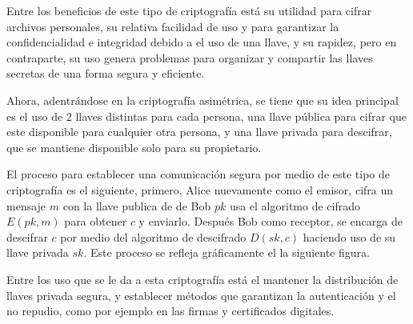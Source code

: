     Entre los beneficios de este tipo de criptografía está su utilidad para 
    cifrar archivos personales, su relativa facilidad de uso y para garantizar 
    la confidencialidad e integridad debido a el uso de una llave, y su 
    rapidez, pero en contraparte, su uso genera problemas para organizar y 
    compartir las llaves secretas de una forma segura y eficiente.
  
    Ahora, adentrándose en la criptografía asimétrica, se tiene que su idea 
    principal es el uso de 2 llaves distintas para cada persona, una llave 
    pública para cifrar que este disponible para cualquier otra persona, y una 
    llave privada para descifrar, que se mantiene disponible solo para su 
    propietario.
  
    El proceso para establecer una comunicación segura por medio de este tipo 
    de criptografía es el siguiente, primero, Alice nuevamente como el emisor, 
    cifra un mensaje $m$ con la llave publica de de Bob $pk$ usa el algoritmo 
    de cifrado $E(pk,m)$ para obtener $c$ y enviarlo. Después Bob como 
    receptor, se encarga de descifrar $c$ por medio del algoritmo de 
    descifrado $D(sk,c)$ haciendo uso de su llave privada $sk$. Este proceso 
    se refleja gráficamente el la siguiente figura.

    Entre los uso que se le da a esta criptografía está el mantener la 
    distribución de llaves privada segura, y establecer métodos que garantizan 
    la autenticación y el no repudio, como por ejemplo en las firmas y 
    certificados digitales.
